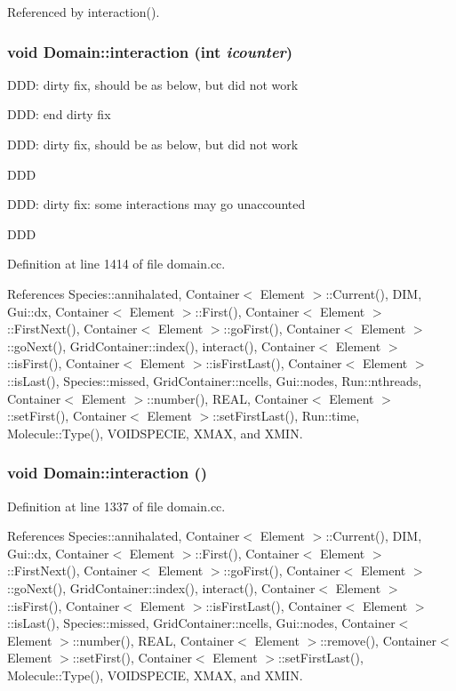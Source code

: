 Referenced by interaction().\hypertarget{classDomain_2f93de66854d4fc26d4d326301e99214}{
\subsubsection[{interaction}]{\setlength{\rightskip}{0pt plus 5cm}void Domain::interaction (int {\em icounter})}}
\label{classDomain_2f93de66854d4fc26d4d326301e99214}




DDD: dirty fix, should be as below, but did not work

DDD: end dirty fix

DDD: dirty fix, should be as below, but did not work

DDD

DDD: dirty fix: some interactions may go unaccounted

DDD 

Definition at line 1414 of file domain.cc.

References Species::annihalated, Container$<$ Element $>$::Current(), DIM, Gui::dx, Container$<$ Element $>$::First(), Container$<$ Element $>$::FirstNext(), Container$<$ Element $>$::goFirst(), Container$<$ Element $>$::goNext(), GridContainer::index(), interact(), Container$<$ Element $>$::isFirst(), Container$<$ Element $>$::isFirstLast(), Container$<$ Element $>$::isLast(), Species::missed, GridContainer::ncells, Gui::nodes, Run::nthreads, Container$<$ Element $>$::number(), REAL, Container$<$ Element $>$::setFirst(), Container$<$ Element $>$::setFirstLast(), Run::time, Molecule::Type(), VOIDSPECIE, XMAX, and XMIN.\hypertarget{classDomain_567821d9c182227ce912ebae35793dd1}{
\subsubsection[{interaction}]{\setlength{\rightskip}{0pt plus 5cm}void Domain::interaction ()}}
\label{classDomain_567821d9c182227ce912ebae35793dd1}




Definition at line 1337 of file domain.cc.

References Species::annihalated, Container$<$ Element $>$::Current(), DIM, Gui::dx, Container$<$ Element $>$::First(), Container$<$ Element $>$::FirstNext(), Container$<$ Element $>$::goFirst(), Container$<$ Element $>$::goNext(), GridContainer::index(), interact(), Container$<$ Element $>$::isFirst(), Container$<$ Element $>$::isFirstLast(), Container$<$ Element $>$::isLast(), Species::missed, GridContainer::ncells, Gui::nodes, Container$<$ Element $>$::number(), REAL, Container$<$ Element $>$::remove(), Container$<$ Element $>$::setFirst(), Container$<$ Element $>$::setFirstLast(), Molecule::Type(), VOIDSPECIE, XMAX, and XMIN.

